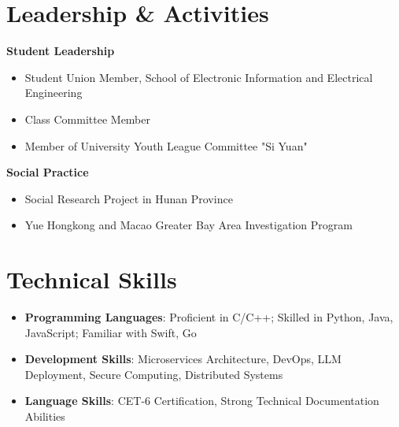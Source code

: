 \documentclass[a4paper]{article}
\begin{document}
\section*{Leadership \& Activities}
\begin{minipage}{0.48\textwidth}
\textbf{Student Leadership}
\begin{itemize}[leftmargin=*,itemsep=0.1em,topsep=0.1em]
\item Student Union Member, School of Electronic Information and Electrical Engineering
\item Class Committee Member
\item Member of University Youth League Committee "Si Yuan"
\end{itemize}
\end{minipage}
\begin{minipage}{0.48\textwidth}
\textbf{Social Practice}
\begin{itemize}[leftmargin=*,itemsep=0.1em,topsep=0.1em]
\item Social Research Project in Hunan Province
\item Yue Hongkong and Macao Greater Bay Area Investigation Program
\end{itemize}
\end{minipage}

\section*{Technical Skills}
\begin{itemize}[leftmargin=*,itemsep=0.2em,topsep=0.2em]
\item \textbf{Programming Languages}: Proficient in C/C++; Skilled in Python, Java, JavaScript; Familiar with Swift, Go
\item \textbf{Development Skills}: Microservices Architecture, DevOps, LLM Deployment, Secure Computing, Distributed Systems
\item \textbf{Language Skills}: CET-6 Certification, Strong Technical Documentation Abilities
\end{itemize}
\end{document}
